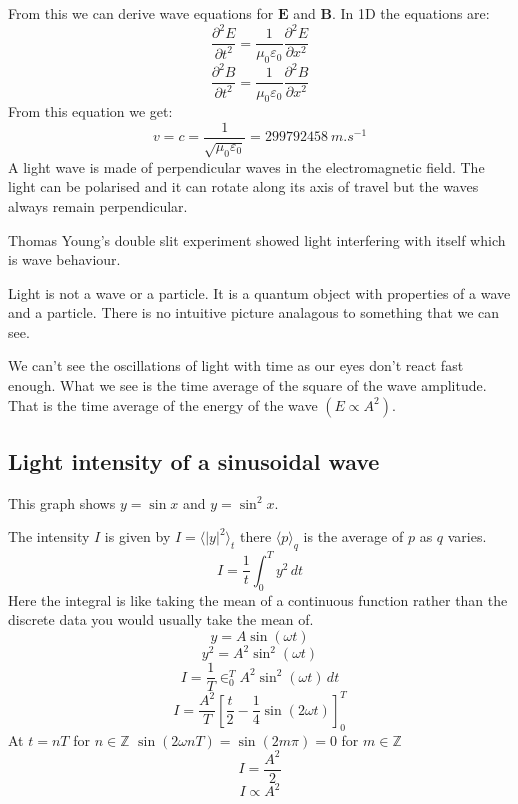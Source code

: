 \documentclass{article}
\renewcommand{\vec}[1]{\underline{#1}}
\renewcommand{\vec}[1]{\bm{#1}}
\newcommand{\vv}[1]{\vec{#1}}
\newcommand{\pd}[3][]{\frac{\partial^{#1}{#2}}{\partial{#3}^{#1}}}
\newcommand{\bb}[1]{\mathbb{#1}}
\begin{document}
From this we can derive wave equations for \(\vv E\) and \(\vv B\). In 1D the equations are:
\[\pd[2]{E}{t}=\frac{1}{\mu_0\varepsilon_0}\pd[2]{E}{x}\]
\[\pd[2]{B}{t}=\frac{1}{\mu_0\varepsilon_0}\pd[2]{B}{x}\]
From this equation we get:
\[v=c=\frac{1}{\sqrt{\mu_0\varepsilon_0}}=\SI{299792458}{m.s^{-1}}\]
A light wave is made of perpendicular waves in the electromagnetic field. The light can be polarised and it can rotate along its axis of travel but the waves always remain perpendicular.

Thomas Young's double slit experiment showed light interfering with itself which is wave behaviour.

Light is not a wave or a particle. It is a quantum object with properties of a wave and a particle. There is no intuitive picture analagous to something that we can see.

We can't see the oscillations of light with time as our eyes don't react fast enough. What we see is the time average of the square of the wave amplitude. That is the time average of the energy of the wave \((E\propto A^2)\).

\subsection*{Light intensity of a sinusoidal wave}


This graph shows \(y=\sin x\) and \(y=\sin^2x\).

The intensity \(I\) is given by \(I=\langle|y|^2\rangle_t\) there \(\langle p\rangle_q\) is the average of \(p\) as \(q\) varies.
\[I=\frac 1t\int_0^Ty^2\,dt\]
Here the integral is like taking the mean of a continuous function rather than the discrete data you would usually take the mean of.
\[y=A\sin(\omega t)\]
\[y^2=A^2\sin^2(\omega t)\]
\[I=\frac 1T\in_0^TA^2\sin^2(\omega t)\,dt\]
\[I=\frac{A^2}{T}\left[\frac t2-\frac 14\sin(2\omega t)\right]_0^T\]
At \(t=nT\) for \(n\in\bb Z\) \(\sin(2\omega nT)=\sin(2m\pi)=0\) for \(m\in\bb Z\)
\[I=\frac{A^2}{2}\]
\[I\propto A^2\]
\end{document}
